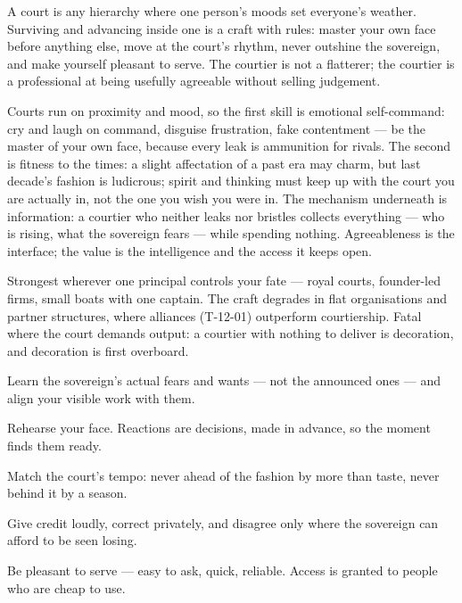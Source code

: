 \begin{core}
A court is any hierarchy where one person's moods set everyone's weather. Surviving and advancing inside one is a craft with rules: master your own face before anything else, move at the court's rhythm, never outshine the sovereign, and make yourself pleasant to serve. The courtier is not a flatterer; the courtier is a professional at being usefully agreeable without selling judgement.
\end{core}
\begin{mechanism}
Courts run on proximity and mood, so the first skill is emotional self-command: cry and laugh on command, disguise frustration, fake contentment --- be the master of your own face, because every leak is ammunition for rivals. The second is fitness to the times: a slight affectation of a past era may charm, but last decade's fashion is ludicrous; spirit and thinking must keep up with the court you are actually in, not the one you wish you were in. The mechanism underneath is information: a courtier who neither leaks nor bristles collects everything --- who is rising, what the sovereign fears --- while spending nothing. Agreeableness is the interface; the value is the intelligence and the access it keeps open.
\end{mechanism}
\begin{conditions}
Strongest wherever one principal controls your fate --- royal courts, founder-led firms, small boats with one captain. The craft degrades in flat organisations and partner structures, where alliances (T-12-01) outperform courtiership. Fatal where the court demands output: a courtier with nothing to deliver is decoration, and decoration is first overboard.
\end{conditions}
\begin{application}
  \item Learn the sovereign's actual fears and wants --- not the announced ones --- and align your visible work with them.
  \item Rehearse your face. Reactions are decisions, made in advance, so the moment finds them ready.
  \item Match the court's tempo: never ahead of the fashion by more than taste, never behind it by a season.
  \item Give credit loudly, correct privately, and disagree only where the sovereign can afford to be seen losing.
  \item Be pleasant to serve --- easy to ask, quick, reliable. Access is granted to people who are cheap to use.
\end{application}
